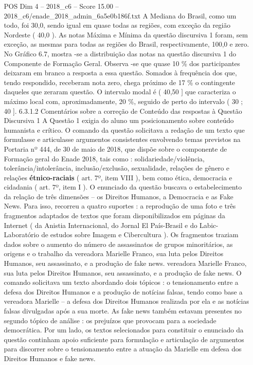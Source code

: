 \begin{textsample}{POS Dim 4 – 2018\_c6 – Score 15.00 – 2018\_c6/enade\_2018\_admin\_6a5e0b186f.txt}
A Mediana do Brasil, como um todo, foi 30,0, sendo igual em quase todas as regiões, com exceção da região Nordeste ( 40,0 ).
As notas Máxima e Mínima da questão discursiva 1 foram, sem exceção, as mesmas para todas as regiões do Brasil, respectivamente, 100,0 e zero.
No Gráfico 6.7, mostra -se a distribuição das notas na questão discursiva 1 do Componente de Formação Geral.
Observa -se que quase 10 \% dos participantes deixaram em branco a resposta a essa questão.
Somados à frequência dos que, tendo respondido, receberam nota zero, chega próximo de 17 \% o contingente daqueles que zeraram questão.
O intervalo modal é ( 40,50 ] que caracteriza o máximo local com, aproximadamente, 20 \%, seguido de perto do intervalo ( 30 ; 40 ]. 6.3.1.2 Comentários sobre a correção de Conteúdo das respostas à Questão Discursiva 1 A Questão 1 exigia do aluno um posicionamento sobre conteúdo humanista e crítico.
O comando da questão solicitava a redação de um texto que formulasse e articulasse argumentos consistentes envolvendo temas previstos na Portaria nº 444, de 30 de maio de 2018, que dispõe sobre o componente de Formação geral do Enade 2018, tais como : solidariedade/violência, tolerância/intolerância, inclusão/exclusão, sexualidade, relações de gênero e relações \textbf{étnico-raciais} ( art. 7º, item VIII ), bem como ética, democracia e cidadania ( art. 7º, item I ).
O enunciado da questão buscava o estabelecimento da relação de três dimensões – os Direitos Humanos, a Democracia e as Fake News.
Para isso, recorreu a quatro suportes : a reprodução de uma foto e três fragmentos adaptados de textos que foram disponibilizados em páginas da Internet ( da Anistia Internacional, do Jornal El País-Brasil e do Labic-Laboratório de estudos sobre Imagem e Cibercultura ).
Os fragmentos traziam dados sobre o aumento do número de assassinatos de grupos minoritários, as origens e o trabalho da vereadora Marielle Franco, sua luta pelos Direitos Humanos, seu assassinato, e a produção de fake news. vereadora Marielle Franco, sua luta pelos Direitos Humanos, seu assassinato, e a produção de fake news.
O comando solicitava um texto abordando dois tópicos : o tensionamento entre a defesa dos Direitos Humanos e a produção de notícias falsas, tendo como base a vereadora Marielle – a defesa dos Direitos Humanos realizada por ela e as notícias falsas divulgadas após a sua morte.
As fake news também estavam presentes no segundo tópico de análise : os prejuízos que provocam para a sociedade democrática.
Por um lado, os textos selecionados para constituir o enunciado da questão continham apoio suficiente para formulação e articulação de argumentos para discorrer sobre o tensionamento entre a atuação da Marielle em defesa dos Direitos Humanos e fake news.

\end{textsample}
